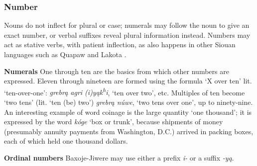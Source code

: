 \documentclass[output=paper]{LSP/langsci}
\begin{document}
\subsubsection{Number}  Nouns do not inflect for plural or case; numerals may follow the noun to give an exact number, or verbal suffixes reveal plural information instead.  Numbers may act as stative verbs, with  patient inflection, as also happens in other Siouan languages such as Quapaw \citep[481]{Rankin2008} and Lakota \citep[708]{Ullrich2008}.  

\vspace{1em}
\textbf{Numerals}  One through ten are the basics from which other numbers are expressed. Eleven through nineteen are formed using the formula `X over ten' {lit. `ten-over-one'}: \textit{grebr\k{a} agri (i)y\k{a}k\textsuperscript{h}i}, `ten over two', etc. Multiples of ten become `two tens' (lit. `ten (be) two') \textit{grebr\k{a} n\'uwe}, `two tens over one',  up to ninety-nine.  An interesting example of word coinage is the large quantity `one thousand'; it is expressed by the word \textit{k\'oge} `box or trunk', because shipments of money (presumably annuity payments from Washington, D.C.) arrived in packing boxes, each of which held one thousand dollars.
											
\vspace{1em}
\textbf{Ordinal numbers}  Baxoje-Jiwere may use either a prefix \textit{i-} or a suffix \textit{-y\k{a}}.
\end{document}
